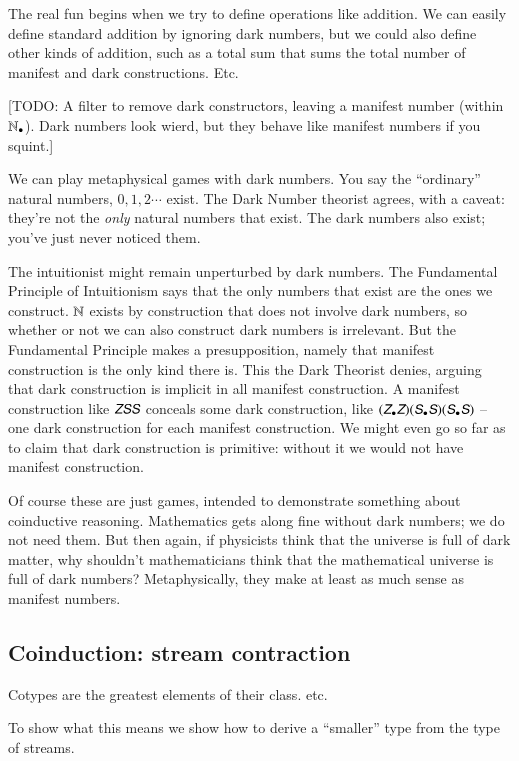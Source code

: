 The real fun begins when we try to define operations like addition. We
can easily define standard addition by ignoring dark numbers, but we
could also define other kinds of addition, such as a total sum that
sums the total number of manifest and dark constructions. Etc.

[TODO:  A
  filter to remove dark constructors, leaving a manifest number
  (within \(\mathbb{N}_{\bullet}\)). Dark numbers look wierd, but they behave like
  manifest numbers if you squint.]


We can play metaphysical games with dark numbers. You say the
``ordinary'' natural numbers, \(0,1,2\cdots\) exist. The Dark Number
theorist agrees, with a caveat: they're not the \textit{only} natural
numbers that exist. The dark numbers also exist; you've just never
noticed them.

The intuitionist might remain unperturbed by dark numbers. The
Fundamental Principle of Intuitionism says that the only numbers that
exist are the ones we construct. \(\mathbb{N}\) exists by construction that
does not involve dark numbers, so whether or not we can also construct
dark numbers is irrelevant. But the Fundamental Principle makes a
presupposition, namely that manifest construction is the only kind
there is. This the Dark Theorist denies, arguing that dark
construction is implicit in all manifest construction. A manifest
construction like \(\ZSS\) conceals some dark construction, like
\((\ZDark\ZNat)(\SDark\SNat)(\SDark\SNat)\) -- one dark construction
for each manifest construction. We might even go so far as to claim
that dark construction is primitive: without it we would not have
manifest construction.

Of course these are just games, intended to demonstrate something
about coinductive reasoning. Mathematics gets along fine without dark
numbers; we do not need them. But then again, if physicists think that
the universe is full of dark matter, why shouldn't mathematicians
think that the mathematical universe is full of dark numbers?
Metaphysically, they make at least as much sense as manifest numbers.

\subsection{Coinduction: stream contraction}

Cotypes are the greatest elements of their class.  etc.

To show what this means we show how to derive a ``smaller'' type from
the type of streams.

